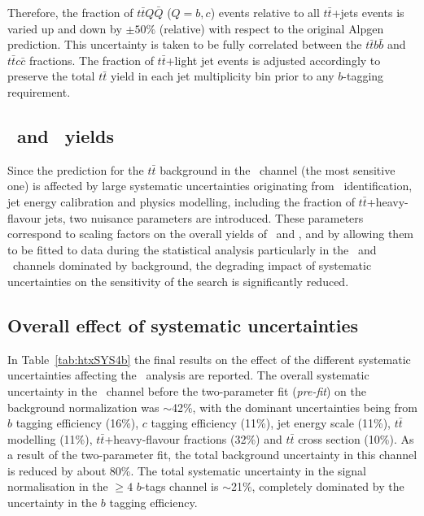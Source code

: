 Therefore, the fraction of $t\bar{t}Q\bar{Q}$ ($Q=b,c$) events relative to all $t\bar{t}$+jets events
is varied up and down by $\pm 50\%$ (relative) with respect to the original {\sc Alpgen} prediction. 
This uncertainty is taken to be fully correlated between the $t\bar{t}b\bar{b}$ and $t\bar{t}c\bar{c}$ fractions.
The fraction of $t\bar{t}$+light jet events is adjusted accordingly to preserve the total $t\bar{t}$ yield in each jet multiplicity bin 
prior to any $b$-tagging requirement.


\subsection{\tthf\ and \ttlf\ yields}\label{sec:htxNuisance}

Since the prediction for the $t\bar{t}$ background
in the \chiv\ channel (the most sensitive one) is affected by large
systematic uncertainties originating from \bjet\ identification, jet energy calibration and
physics modelling, including the fraction of $t\bar{t}$+heavy-flavour jets, 
two nuisance parameters are introduced.
These parameters correspond to  scaling factors on the overall yields of 
\tthf\ and \ttlf, and by allowing them to be fitted to data during the statistical analysis
particularly in the \chii\ and \chiii\ channels dominated by background,
the degrading impact of systematic uncertainties on the sensitivity of the search
is significantly reduced. 

\subsection{Overall effect of systematic uncertainties}\label{sec:htxALLSYS}

In Table~\ref{tab:htxSYS4b} the final results on
the effect of the different systematic uncertainties affecting
the \htx\ analysis are reported.
The overall systematic uncertainty in the \chiv\ channel
before the two-parameter fit ({\it pre-fit})
on the background normalization was
$\sim$42\%, with the dominant uncertainties being from $b$ tagging efficiency (16\%),
$c$ tagging efficiency (11\%), jet energy scale (11\%), $t\bar{t}$ modelling (11\%), 
$t\bar{t}$+heavy-flavour fractions (32\%) and $t\bar{t}$ cross section (10\%).
As a result of the two-parameter fit, the total background uncertainty 
in this channel is reduced 
by about 80\%. The total  systematic uncertainty
in the signal normalisation in the $\geq 4$ $b$-tags channel is 
$\sim$21\%, completely dominated by the uncertainty in the $b$ tagging efficiency.


